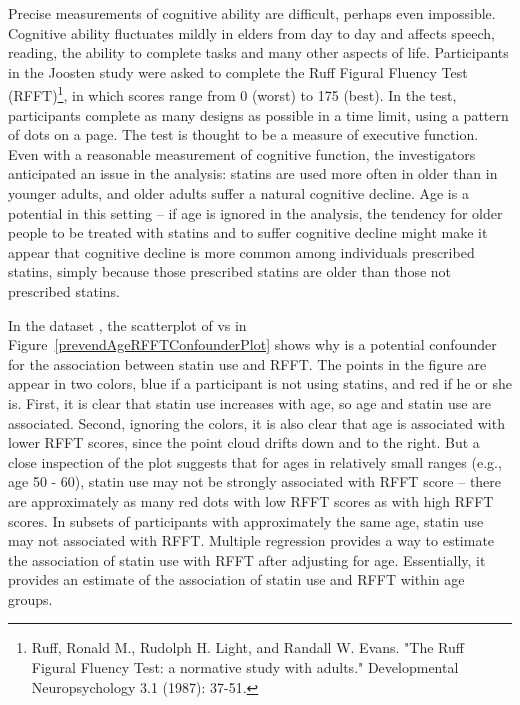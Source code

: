  
Precise measurements of cognitive ability are difficult, perhaps even impossible.  Cognitive ability fluctuates mildly in elders from day to day and affects speech, reading, the ability to complete tasks and many other aspects of life.  Participants in the Joosten study were asked to complete the Ruff Figural Fluency Test (RFFT)\footnote{Ruff, Ronald M., Rudolph H. Light, and Randall W. Evans. "The Ruff Figural Fluency Test: a normative study with adults." Developmental Neuropsychology 3.1 (1987): 37-51.}, in which scores range from 0 (worst) to 175 (best).  In the test, participants complete as many designs as possible in a time limit, using a pattern of dots on a page.  The test is thought to be a measure of executive function.  Even with a reasonable measurement of cognitive function, the investigators anticipated an issue in the analysis: statins are used more often in older than in younger adults, and older adults suffer a natural cognitive decline.  Age is a potential  in this setting -- if age is ignored in the analysis, the tendency for older people to be treated with statins and to suffer cognitive decline might make it appear that cognitive decline is more common among individuals prescribed statins, simply because those prescribed statins are older than those not prescribed statins.

In the dataset , the scatterplot of  vs  in Figure~\ref{prevendAgeRFFTConfounderPlot} shows why  is a potential confounder for the association between statin use and RFFT.  The points in the figure are appear in two colors, blue if a participant is not using statins, and red if he or she is.  First, it is clear that statin use increases with age, so age and statin use are associated.  Second, ignoring the colors, it is also clear that age is associated with lower RFFT scores, since the point cloud drifts down and to the right.  But a close inspection of the plot suggests that for ages in relatively small ranges (e.g., age 50 - 60), statin use may not be strongly associated with RFFT score -- there are approximately as many red dots with low RFFT scores as with high RFFT scores.  In subsets of participants with approximately the same age, statin use may not associated with RFFT. Multiple regression provides a way to estimate the association of statin use with RFFT after adjusting for age.  Essentially, it provides an estimate of the association of statin use and RFFT within age groups.

